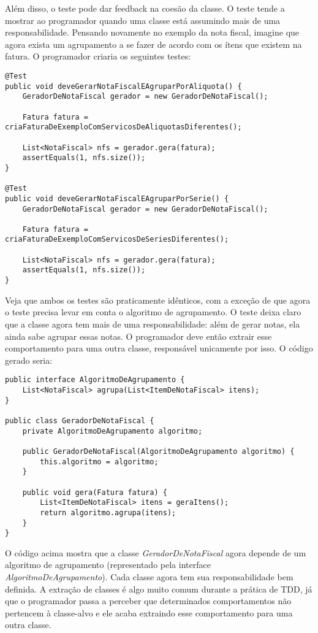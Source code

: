 Além disso, o teste pode dar feedback na coesão da classe. O teste tende a mostrar ao programador quando uma classe está assumindo mais
de uma responsabilidade. Pensando novamente no exemplo da nota fiscal, imagine que agora exista um agrupamento a se fazer de acordo com os 
ítens que existem na fatura. O programador criaria os seguintes testes:

\begin{lstlisting}[frame=trbl]
@Test
public void deveGerarNotaFiscalEAgruparPorAliquota() {
	GeradorDeNotaFiscal gerador = new GeradorDeNotaFiscal();
	
	Fatura fatura = criaFaturaDeExemploComServicosDeAliquotasDiferentes();
	
	List<NotaFiscal> nfs = gerador.gera(fatura);
	assertEquals(1, nfs.size());
}

@Test
public void deveGerarNotaFiscalEAgruparPorSerie() {
	GeradorDeNotaFiscal gerador = new GeradorDeNotaFiscal();
	
	Fatura fatura = criaFaturaDeExemploComServicosDeSeriesDiferentes();
	
	List<NotaFiscal> nfs = gerador.gera(fatura);
	assertEquals(1, nfs.size());
}
\end{lstlisting}

Veja que ambos os testes são praticamente idênticos, com a exceção de que agora o teste precisa levar em conta o algoritmo de agrupamento. 
O teste deixa claro que a classe agora tem mais de uma responsabilidade: além de gerar notas, ela ainda sabe agrupar essas notas. O programador
deve então extrair esse comportamento para uma outra classe, responsável unicamente por isso. O código gerado seria:

\begin{lstlisting}[frame=trbl]
public interface AlgoritmoDeAgrupamento {
	List<NotaFiscal> agrupa(List<ItemDeNotaFiscal> itens);
}

public class GeradorDeNotaFiscal {
	private AlgoritmoDeAgrupamento algoritmo;
	
	public GeradorDeNotaFiscal(AlgoritmoDeAgrupamento algoritmo) {
		this.algoritmo = algoritmo;
	}
	
	public void gera(Fatura fatura) {
		List<ItemDeNotaFiscal> itens = geraItens();
		return algoritmo.agrupa(itens);
	}
}
\end{lstlisting}

O código acima mostra que a classe \textit{GeradorDeNotaFiscal} agora depende de um algoritmo de agrupamento (representado pela interface
\textit{AlgoritmoDeAgrupamento}). Cada classe agora tem sua responsabilidade bem definida. A extração de classes é algo muito comum
durante a prática de TDD, já que o programador passa a perceber que determinados comportamentos não pertencem à classe-alvo e ele
acaba extraindo esse comportamento para uma outra classe. 

